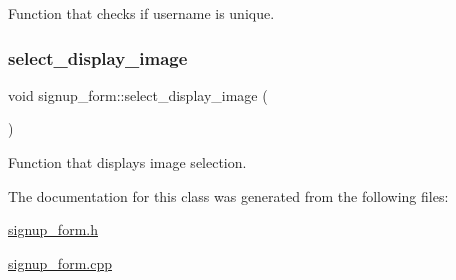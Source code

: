 Function that checks if username is unique. 

\mbox{\label{classsignup__form_a919a6d06a8b45ec3672341d840572a0f}} 
\subsubsection{\texorpdfstring{select\+\_\+display\+\_\+image}{select\_display\_image}}
{\footnotesize\ttfamily void signup\+\_\+form\+::select\+\_\+display\+\_\+image (\begin{DoxyParamCaption}{ }\end{DoxyParamCaption})\hspace{0.3cm}{\ttfamily [slot]}}



Function that displays image selection. 



The documentation for this class was generated from the following files\+:\begin{DoxyCompactItemize}
\item 
\hyperlink{signup__form_8h}{signup\+\_\+form.\+h}\item 
\hyperlink{signup__form_8cpp}{signup\+\_\+form.\+cpp}\end{DoxyCompactItemize}
